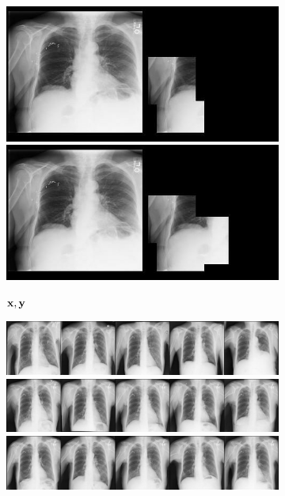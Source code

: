 \begin{figure}[t]
\begin{subfigure}[t]{0.16\textwidth}
    \includegraphics[height=\xrayimgheight]{figs/cigcvae/image-samples/xray/x_y_5.jpg}
    \includegraphics[height=\xrayimgheight]{figs/cigcvae/image-samples/xray/x_y_6.jpg}
    \caption{$\mathbf{x}, \mathbf{y}$}
  \end{subfigure}
  \begin{subfigure}[t]{0.4\textwidth}
    \centering
    \includegraphics[height=\xrayimgheight]{figs/cigcvae/image-samples/xray/ipa_1.jpg}
    \includegraphics[height=\xrayimgheight]{figs/cigcvae/image-samples/xray/ipa_2.jpg}
    \includegraphics[height=\xrayimgheight]{figs/cigcvae/image-samples/xray/ipa_3.jpg}

\end{subfigure}
\end{figure}
